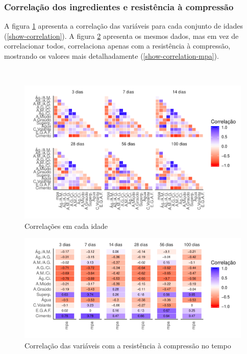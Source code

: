 \documentclass[]{article}
\begin{document}
\hypertarget{correlauxe7uxe3o-dos-ingredientes-e-resistuxeancia-uxe0-compressuxe3o}{%
\subsubsection{Correlação dos ingredientes e resistência à
compressão}\label{correlauxe7uxe3o-dos-ingredientes-e-resistuxeancia-uxe0-compressuxe3o}}

A figura \ref{fig:correlation} apresenta a correlação das variáveis para
cada conjunto de idades (\ref{show-correlation}). A figura
\ref{fig:correlation-mpa} apresenta os mesmos dados, mas em vez de
correlacionar todos, correlaciona apenas com a resistência à compressão,
mostrando os valores mais detalhadamente (\ref{show-correlation-mpa}).

~

\begin{figure}

{\centering \includegraphics{paper_PT_files/figure-latex/correlation-1} 

}

\caption{Correlações em cada idade}\label{fig:correlation}
\end{figure}
\begin{figure}

{\centering \includegraphics{paper_PT_files/figure-latex/correlation-mpa-1} 

}

\caption{Correlação das variáveis com a resistência à compressão no tempo}\label{fig:correlation-mpa}
\end{figure}
\end{document}
